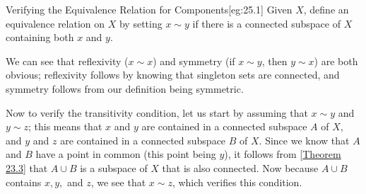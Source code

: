 \begin{egBox}{Verifying the Equivalence Relation for Components}[eg:25.1]
    Given \( X \), define an equivalence relation on \( X \) by setting 
    \( x \sim y \) if there is a connected subspace of \( X \) containing both
    \( x \) and \( y \).

    \baseSkip

    We can see that reflexivity (\( x \sim x \)) and symmetry (if 
    \( x \sim y \), then \( y \sim x \)) are both obvious; reflexivity follows
    by knowing that singleton sets are connected, and symmetry follows from
    our definition being symmetric.

    \baseSkip

    Now to verify the transitivity condition, let us start by assuming that 
    \( x \sim y \) and \( y \sim z \); this means that \( x \) and \( y \) are
    contained in a connected subspace \( A \) of \( X \), and \( y \) and 
    \( z \) are contained in a connected subspace \( B \) of \( X \).
    Since we know that \( A \) and \( B \) have a point in common (this point
    being \( y \)), it follows from [\hyperlink{thm:23.3}{Theorem 23.3}] that 
    \( A \cup B \) is a subspace of \( X \) that is also connected.
    Now because \( A \cup B \) contains \( x, y, \) and \( z \), we see that 
    \( x \sim z \), which verifies this condition.
\end{egBox}

